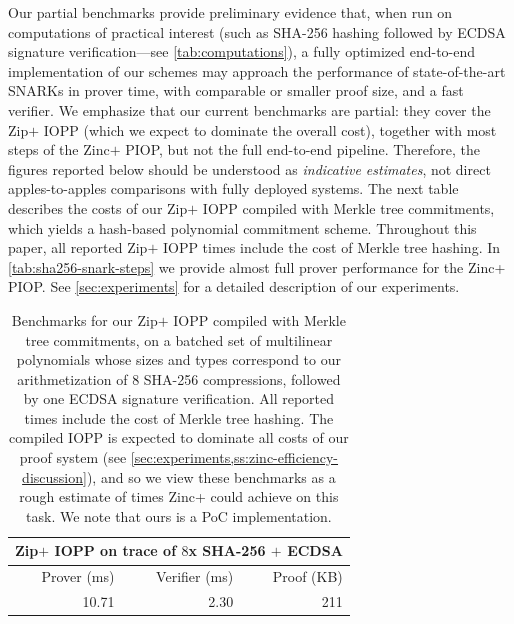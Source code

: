 Our partial benchmarks provide preliminary evidence that, when run on computations of practical interest (such as SHA-256 hashing followed by ECDSA signature verification---see \cref{tab:computations}), a fully optimized end-to-end implementation of our schemes may approach the performance of state-of-the-art SNARKs in prover time, with comparable or smaller proof size, and a fast verifier. We emphasize that our current benchmarks are partial: they cover the Zip$+$ IOPP (which we expect to dominate the overall cost), together with most steps of the Zinc$+$ PIOP, but not the full end-to-end pipeline. Therefore, the figures reported below should be understood as \emph{indicative estimates}, not direct apples-to-apples comparisons with fully deployed systems. The next table describes the costs of our Zip$+$ IOPP compiled with Merkle tree commitments, which yields a hash-based polynomial commitment scheme. Throughout this paper, all reported Zip$+$ IOPP times include the cost of Merkle tree hashing.   In \cref{tab:sha256-snark-steps} we provide almost full prover performance for the Zinc+ PIOP. See \cref{sec:experiments} for a detailed description of our experiments.  %

\begin{table}[H]
\centering
\begin{tabular}{rrr}
\toprule
\multicolumn{3}{c}{\textbf{Zip$+$ IOPP  on  trace of $8$x SHA-256  $+$ ECDSA}} \\
\midrule
Prover (ms) & Verifier (ms) & Proof (KB) \\
\midrule
10.71 & 2.30 & 211 \\
\bottomrule
\end{tabular}
\caption{Benchmarks for our Zip$+$ IOPP compiled with Merkle tree commitments, on a batched set of multilinear polynomials whose sizes and types correspond   to our arithmetization of $8$ SHA-256 compressions, followed by one ECDSA signature verification.  All reported times include the cost of Merkle tree hashing.  The compiled IOPP  is expected to dominate all costs of our proof system (see \cref{sec:experiments,ss:zinc-efficiency-discussion}), and so we view these benchmarks as a rough estimate of times Zinc+ could achieve on this task. We note that ours is a PoC implementation.}
\label{tab:intro_benchmarks}
\end{table}




